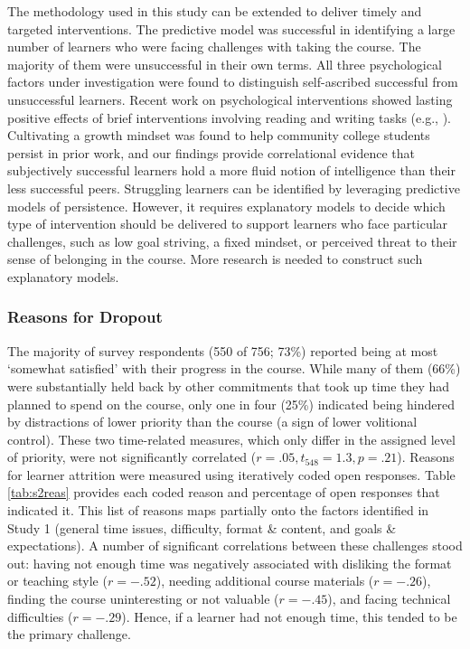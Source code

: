 \documentclass{sigchi}\usepackage[]{graphicx}\usepackage[]{color}
\begin{document}
The methodology used in this study can be extended to deliver timely and targeted interventions. The predictive model was successful in identifying a large number of learners who were facing challenges with taking the course. The majority of them were unsuccessful in their own terms. All three psychological factors under investigation were found to distinguish self-ascribed successful from unsuccessful learners. Recent work on psychological interventions showed lasting positive effects of brief interventions involving reading and writing tasks (e.g., \cite{walton2007question}). Cultivating a growth mindset was found to help community college students persist in prior work, and our findings provide correlational evidence that subjectively successful learners hold a more fluid notion of intelligence than their less successful peers. Struggling learners can be identified by leveraging predictive models of persistence. However, it requires explanatory models to decide which type of intervention should be delivered to support learners who face particular challenges, such as low goal striving, a fixed mindset, or perceived threat to their sense of belonging in the course. More research is needed to construct such explanatory models.

\subsubsection{Reasons for Dropout}

The majority of survey respondents (550 of 756; 73\%) reported being at most `somewhat satisfied' with their progress in the course. While many of them (66\%) were substantially held back by other commitments that took up time they had planned to spend on the course, only one in four (25\%) indicated being hindered by distractions of lower priority than the course (a sign of lower volitional control). These two time-related measures, which only differ in the assigned level of priority, were not significantly correlated ($r=.05, t_{548}=1.3, p=.21$). Reasons for learner attrition were measured using iteratively coded open responses. Table \ref{tab:s2reas} provides each coded reason and percentage of open responses that indicated it. This list of reasons maps partially onto the factors identified in Study 1 (general time issues, difficulty, format \& content, and goals \& expectations). A number of significant correlations between these challenges stood out: having not enough time was negatively associated with disliking the format or teaching style ($r=-.52$), needing additional course materials ($r=-.26$), finding the course uninteresting or not valuable ($r=-.45$), and facing technical difficulties ($r=-.29$). Hence, if a learner had not enough time, this tended to be the primary challenge.
\end{document}
